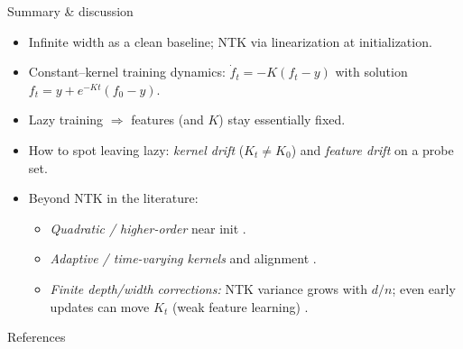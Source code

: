 \documentclass[10pt,aspectratio=169]{beamer}
\begin{document}


\begin{frame}{Summary \& discussion}
	\begin{itemize}
		\item Infinite width as a clean baseline; NTK via linearization at initialization.
		\item Constant–kernel training dynamics: $\dot f_t=-K(f_t-y)$ with solution $f_t=y+e^{-Kt}(f_0-y)$.
		\item Lazy training $\Rightarrow$ features (and $K$) stay essentially fixed.
		\item How to spot leaving lazy: \emph{kernel drift} ($K_t\neq K_0$) and \emph{feature drift} on a probe set.
		\item Beyond NTK in the literature:
		      \begin{itemize}
			      \item \emph{Quadratic / higher-order} near init \citep{bai2020beyond}.
			      \item \emph{Adaptive / time-varying kernels} and alignment \citep{zhang2024beyondntk}.
			      \item \emph{Finite depth/width corrections:} NTK variance grows with $d/n$; even early updates can move $K_t$ (weak feature learning) \citep{haninNica2019finite}.
		      \end{itemize}
	\end{itemize}
\end{frame}
\begin{frame}{References}
	
\end{frame}
\end{document}
